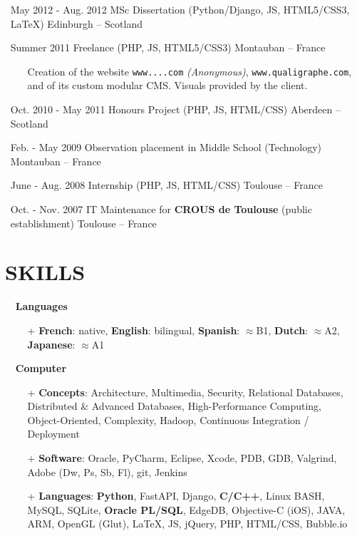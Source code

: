 \documentclass{res}
\begin{document}
\begin{resume}
\begin{itemize}
        \item[] May 2012 - Aug. 2012 \tabto{5cm} MSc Dissertation (Python/Django, JS, HTML5/CSS3, \LaTeX{}) \hfill Edinburgh -- Scotland
        \item[] Summer 2011 \tabto{5cm} Freelance (PHP, JS, HTML5/CSS3) \hfill Montauban -- France
        \begin{itemize}
            \item[] Creation of the website \ifisanon \texttt{www....com} \textit{(Anonymous)}, \else \texttt{www.qualigraphe.com}, \fi and of its custom modular CMS. Visuals provided by the client.
        \end{itemize}
        \item[] Oct. 2010 - May 2011 \tabto{5cm} Honours Project (PHP, JS, HTML/CSS) \hfill Aberdeen -- Scotland
        \item[] Feb. - May 2009 \tabto{5cm} Observation placement in Middle School (Technology) \hfill Montauban -- France
        \item[] June - Aug. 2008 \tabto{5cm} Internship (PHP, JS, HTML/CSS) \hfill Toulouse -- France
        \item[] Oct. - Nov. 2007 \tabto{5cm} IT Maintenance for \textbf{CROUS de Toulouse} (public establishment) \hfill Toulouse -- France
    \end{itemize}

\pagebreak

\section{\faLayerGroup~SKILLS}
    \begin{itemize}
        \item[] \faLanguage~\textbf{Languages}
        \begin{itemize}
            \item[+]  \textbf{French}: native, \textbf{English}: bilingual, \textbf{Spanish}: $\approx$B1, \textbf{Dutch}: $\approx$A2, \textbf{Japanese}: $\approx$A1
        \end{itemize}
    \end{itemize}

    \begin{itemize}
        \item[] \faLaptopCode~\textbf{Computer}
        \begin{itemize}
            \item[+] \textbf{Concepts}: Architecture, Multimedia, Security, Relational Databases, Distributed \& Advanced Databases, High-Performance Computing, Object-Oriented, Complexity, Hadoop, Continuous Integration / Deployment
            \item[+] \textbf{Software}: Oracle, PyCharm, Eclipse, Xcode, PDB, GDB, Valgrind, Adobe (Dw, Ps, Sb, Fl), git, Jenkins
            \item[+] \textbf{Languages}: \textbf{Python}, FastAPI, Django, \textbf{C/C++}, Linux BASH, MySQL, SQLite, \textbf{Oracle PL/SQL}, EdgeDB, Objective-C (iOS), JAVA, ARM, OpenGL (Glut), \LaTeX{}, JS, jQuery, PHP, HTML/CSS, Bubble.io
        \end{itemize}
    \end{itemize}


\end{resume}
\end{document}

